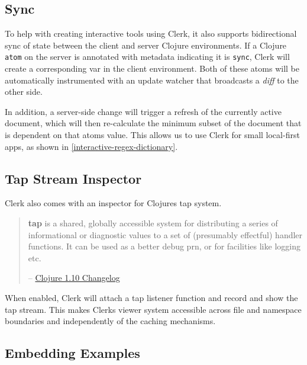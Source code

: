\documentclass[sigconf,screen,pbalance=true]{acmart}
\newcommand{\passthrough}[1]{#1}
\begin{document}
\hypertarget{sync}{%
\subsection{Sync}\label{sync}}

To help with creating interactive tools using Clerk, it also supports bidirectional sync of state between the client and server Clojure environments. If a Clojure \passthrough{\lstinline!atom!} on the server is annotated with metadata indicating it is \passthrough{\lstinline!sync!}, Clerk will create a corresponding var in the client environment. Both of these atoms will be automatically instrumented with an update watcher that broadcasts a \emph{diff} to the other side.

In addition, a server-side change will trigger a refresh of the currently active document, which will then re-calculate the minimum subset of the document that is dependent on that atom\textquotesingle s value. This allows us to use Clerk for small local-first apps, as shown in \autoref{interactive-regex-dictionary}.

\hypertarget{tap-stream-inspector}{%
\subsection{Tap Stream Inspector}\label{tap-stream-inspector}}

Clerk also comes with an inspector for Clojure\textquotesingle s tap system.

\begin{quote}
\textbf{tap} is a shared, globally accessible system for distributing a series of informational or diagnostic values to a set of (presumably effectful) handler functions. It can be used as a better debug prn, or for facilities like logging etc.

-- {\href{https://github.com/clojure/clojure/blob/0b42eab4bfca5270e0d2b2e58d83b1e2c8a85473/changes.md\#23-tap}{Clojure 1.10 Changelog}}
\end{quote}

When enabled, Clerk will attach a tap listener function and record and show the tap stream. This makes Clerk\textquotesingle s viewer system accessible across file and namespace boundaries and independently of the caching mechanisms.

\hypertarget{embedding-examples}{%
\subsection{Embedding Examples}\label{embedding-examples}}
\end{document}
